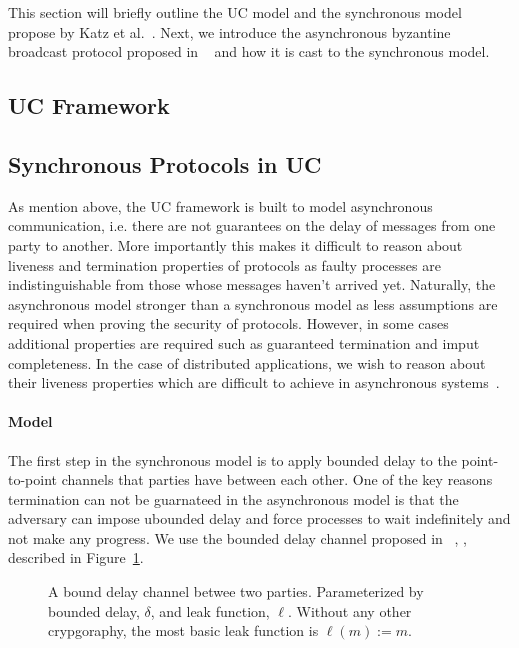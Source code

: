 This section will briefly outline the UC model and the synchronous model propose by Katz et al.~\cite{katz-clock}.
Next, we introduce the asynchronous byzantine broadcast protocol proposed in ~\cite{bracha-broadcast} and how it is cast to the synchronous model.

\subsection{UC Framework}

\subsection{Synchronous Protocols in UC}
As mention above, the UC framework is built to model asynchronous communication, i.e. there are not guarantees on the delay of messages from one party to another.
More importantly this makes it difficult to reason about liveness and termination properties of protocols as faulty processes are indistinguishable from those whose messages haven't arrived yet.
Naturally, the asynchronous model stronger than a synchronous model as less assumptions are required when proving the security of protocols.
However, in some cases additional properties are required such as guaranteed termination and imput completeness.
In the case of distributed applications, we wish to reason about their liveness properties which are difficult to achieve in asynchronous systems~\cite{flp}.

\paragraph{Model} 
The first step in the synchronous model is to apply bounded delay to the point-to-point channels that parties have between each other.
One of the key reasons termination can not be guarnateed in the asynchronous model is that the adversary can impose ubounded delay and force processes to wait indefinitely and not make any progress.
We use the bounded delay channel proposed in ~\cite{katz-clock}, \Fbdsec, described in Figure~\ref{fig:bdsec}.

\begin{figure}
	
	\caption{A bound delay channel betwee two parties. Parameterized by bounded delay, $\delta$, and leak function, $\ell$. Without any other crypgoraphy, the most basic leak function is $\ell(m) := m$.}
	\label{fig:bdsec}
\end{figure}

